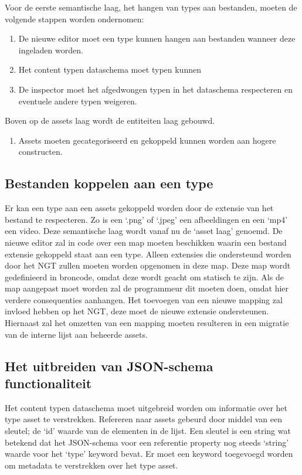Voor de eerste semantische laag, het hangen van types aan bestanden, moeten de volgende stappen worden ondernomen:

\begin{enumerate}
    \item De nieuwe editor moet een type kunnen hangen aan bestanden wanneer deze ingeladen worden.
    \item Het content typen dataschema moet typen kunnen \item De inspector moet het afgedwongen typen in het dataschema respecteren en eventuele andere typen weigeren.
\end{enumerate}

Boven op de assets laag wordt de entiteiten laag gebouwd.

\begin{enumerate}[resume]
    \item Assets moeten gecategoriseerd en gekoppeld kunnen worden aan hogere constructen.
\end{enumerate}

\subsection{Bestanden koppelen aan een type}
Er kan een type aan een assets gekoppeld worden door de extensie van het bestand te respecteren. Zo is een ‘.png’ of ‘.jpeg’ een afbeeldingen en een ‘mp4’ een video. Deze semantische laag wordt vanaf nu de ‘asset laag’ genoemd. De nieuwe editor zal in code over een map moeten beschikken waarin een bestand extensie gekoppeld staat aan een type. Alleen extensies die ondersteund worden door het NGT zullen moeten worden opgenomen in deze map. Deze map wordt gedefinieerd in broncode, omdat deze wordt geacht om statisch te zijn. Als de map aangepast moet worden zal de programmeur dit moeten doen, omdat hier verdere consequenties aanhangen. Het toevoegen van een nieuwe mapping zal invloed hebben op het NGT, deze moet de nieuwe extensie ondersteunen. Hiernaast zal het omzetten van een mapping moeten resulteren in een migratie van de interne lijst aan beheerde assets.

\subsection{Het uitbreiden van JSON-schema functionaliteit}
Het content typen dataschema moet uitgebreid worden om informatie over het type asset te verstrekken. Refereren naar assets gebeurd door middel van een sleutel; de ‘id’ waarde van de elementen in de lijst. Een sleutel is een string wat betekend dat het JSON-schema voor een referentie property nog steeds ‘string’ waarde voor het ‘type’ keyword bevat. Er moet een keyword toegevoegd worden om metadata te verstrekken over het type asset.

